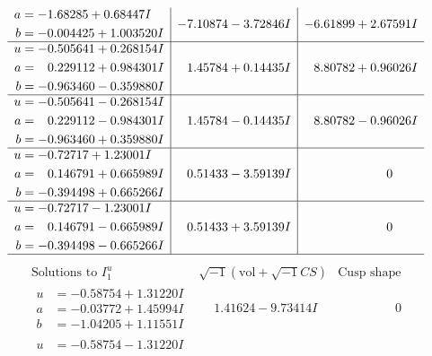 \documentclass[1p]{elsarticle_modified}
\theoremstyle{definition}
\newcommand{\I}{\sqrt{-1}}
\begin{document}
$$\begin{array}{c|c|c}
\begin{aligned}
a &= -1.68285 + 0.68447 I \\
b &= -0.004425 + 1.003520 I\end{aligned}
 & -7.10874 - 3.72846 I & -6.61899 + 2.67591 I \\ \hline\begin{aligned}
u &= -0.505641 + 0.268154 I \\
a &= \phantom{-}0.229112 + 0.984301 I \\
b &= -0.963460 - 0.359880 I\end{aligned}
 & \phantom{-}1.45784 + 0.14435 I & \phantom{-}8.80782 + 0.96026 I \\ \hline\begin{aligned}
u &= -0.505641 - 0.268154 I \\
a &= \phantom{-}0.229112 - 0.984301 I \\
b &= -0.963460 + 0.359880 I\end{aligned}
 & \phantom{-}1.45784 - 0.14435 I & \phantom{-}8.80782 - 0.96026 I \\ \hline\begin{aligned}
u &= -0.72717 + 1.23001 I \\
a &= \phantom{-}0.146791 + 0.665989 I \\
b &= -0.394498 + 0.665266 I\end{aligned}
 & \phantom{-}0.51433 - 3.59139 I & \phantom{-0.000000 } 0 \\ \hline\begin{aligned}
u &= -0.72717 - 1.23001 I \\
a &= \phantom{-}0.146791 - 0.665989 I \\
b &= -0.394498 - 0.665266 I\end{aligned}
 & \phantom{-}0.51433 + 3.59139 I & \phantom{-0.000000 } 0\\
 \hline 
 \end{array}$$\newpage$$\begin{array}{c|c|c}  
\text{Solutions to }I^u_{1}& \I (\text{vol} + \sqrt{-1}CS) & \text{Cusp shape}\\
 \hline 
\begin{aligned}
u &= -0.58754 + 1.31220 I \\
a &= -0.03772 + 1.45994 I \\
b &= -1.04205 + 1.11551 I\end{aligned}
 & \phantom{-}1.41624 - 9.73414 I & \phantom{-0.000000 } 0 \\ \hline\begin{aligned}
u &= -0.58754 - 1.31220 I \\

\end{aligned}
\end{array}$$
\end{document}
